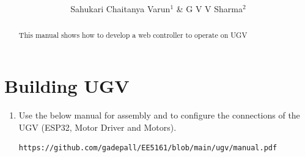 \documentclass[journal,12pt,twocolumn]{IEEEtran}
\renewcommand\thesection{\arabic{section}}
\begin{document}
\let\StandardTheFigure\thefigure
\renewcommand{\thefigure}{\theproblem}



\def\putbox#1#2#3{\makebox[0in][l]{\makebox[#1][l]{}\raisebox{\baselineskip}[0in][0in]{\raisebox{#2}[0in][0in]{#3}}}}
     \def\rightbox#1{\makebox[0in][r]{#1}}
     \def\centbox#1{\makebox[0in]{#1}}
     \def\topbox#1{\raisebox{-\baselineskip}[0in][0in]{#1}}
     \def\midbox#1{\raisebox{-0.5\baselineskip}[0in][0in]{#1}}

\vspace{3cm}

\title{ 
}
\author{Sahukari Chaitanya Varun$^{1}$ \& G V V Sharma$^{2}$ 


}

\maketitle

\tableofcontents

\renewcommand{\thefigure}{\theenumi}
\renewcommand{\thetable}{\theenumi}


\bigskip

\begin{abstract}
%
This manual shows how to develop a web controller to operate on UGV
%
\end{abstract}


\section{Building UGV}
%
\begin{enumerate}[label=\thesection.\arabic*
,ref=\thesection.\theenumi]

\item Use the below manual for assembly and to configure the connections of the UGV (ESP32, Motor Driver and Motors).
\begin{lstlisting}
https://github.com/gadepall/EE5161/blob/main/ugv/manual.pdf
\end{lstlisting}

\end{enumerate}
\end{document}
